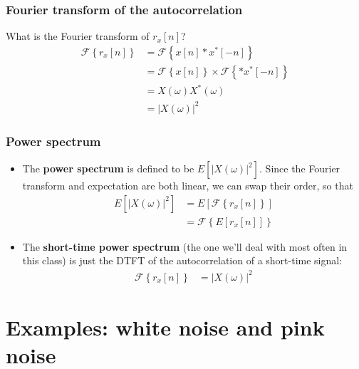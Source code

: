 \documentclass{beamer}
\begin{document}
\begin{frame}
  \frametitle{Fourier transform of the autocorrelation}

  What is the Fourier transform of $r_x[n]$?
  \begin{align*}
    \mathcal{F}\left\{r_x[n]\right\}
    &=\mathcal{F}\left\{x[n]\ast x^*[-n]\right\}\\
    &=\mathcal{F}\left\{x[n]\right\}\times\mathcal{F}\left\{\ast x^*[-n]\right\}\\
    &=X(\omega)X^*(\omega)\\
    &=|X(\omega)|^2
  \end{align*}
\end{frame}

\begin{frame}
  \frametitle{Power spectrum}

  \begin{itemize}
  \item The \textbf{power spectrum} is defined to be
    $E\left[|X(\omega)|^2\right]$.  Since the Fourier transform and
    expectation are both linear, we can swap their order, so that
    \begin{align*}
      E\left[|X(\omega)|^2\right] &=  E\left[\mathcal{F}\left\{r_x[n]\right\}\right]\\
      &=  \mathcal{F}\left\{E\left[r_x[n]\right]\right\}
    \end{align*}
  \item The \textbf{short-time power spectrum} (the one we'll deal
    with most often in this class) is just the DTFT of the
    autocorrelation of a short-time signal:
    \begin{align*}
      \mathcal{F}\left\{r_x[n]\right\}
      &=|X(\omega)|^2
    \end{align*}
  \end{itemize}
\end{frame}

\section[White Noise]{Examples: white noise and pink noise}
\end{document}
